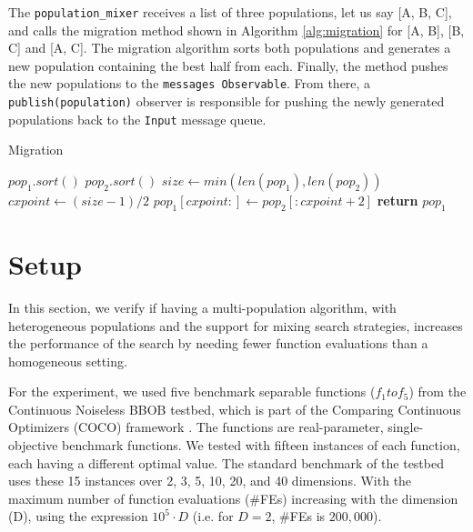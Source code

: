 The \texttt{population\_mixer} receives a list of three populations,
let us say [A, B, C], and calls the migration method shown in
Algorithm \ref{alg:migration}  for [A, B], [B, C] and [A, C]. 
The migration algorithm sorts both populations and generates
a new population containing the best half from each.
Finally, the method pushes the new populations to the 
\texttt{messages Observable}. From there, a
\texttt{publish(population)} observer is responsible for pushing
the newly generated populations back to the \texttt{Input} message queue.

\begin{algorithm}
    \caption{Migration}
    \label{alg:migration}
    \begin{algorithmic}[1]
            \State $pop_1.sort()$
            \State $pop_2.sort()$
            \State $size\gets min(len(pop_1), len(pop_2))$
            \State $cxpoint\gets (size-1)/2$
            \State $pop_1[cxpoint:]\gets pop_2[:cxpoint+2]$
            \State \textbf{return} $pop_1$
        \EndProcedure 
    \end{algorithmic}
\end{algorithm}



\section{Setup}
\label{setup}

In this section, we verify if having a multi-population algorithm, with
heterogeneous populations and the support for mixing search strategies,
increases the performance of the search by needing fewer function evaluations
than a homogeneous setting.

For the experiment, we used five benchmark separable functions ($f_1 to f_5 $)
from the Continuous Noiseless BBOB testbed, which is part of the Comparing
Continuous Optimizers (COCO) framework \cite{hansen2016coco}. The functions are
real-parameter, single-objective benchmark functions. We tested with fifteen
instances of each function, each having a different optimal value. The standard
benchmark of the testbed uses these 15 instances over 2, 3, 5, 10, 20, and 40
dimensions. With the maximum number of function evaluations (\#FEs) increasing
with the dimension (D), using the expression $10^5 \cdot D$ (i.e. for $D = 2$,
\#FEs is $200,000$).

